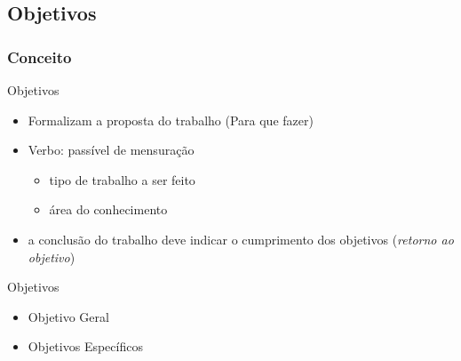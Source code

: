 \documentclass{beamer}
\begin{document}


\subsection{Objetivos}

\subsubsection{Conceito}

\begin{frame}{Objetivos}
  \begin{itemize}
    \footnotesize
  \item Formalizam a proposta do trabalho (\alert{Para que} fazer)
    \bigskip
  \item \alert{Verbo}: passível de mensuração
    \begin{itemize}
      \scriptsize
    \item tipo de trabalho a ser feito
    \item área do conhecimento
    \end{itemize}
    \bigskip
    \item a conclusão do trabalho deve indicar o cumprimento dos
      objetivos ({\em retorno ao objetivo})
  \end{itemize}
\end{frame}

\begin{frame}{Objetivos}
  \begin{itemize}
    \footnotesize
  \item Objetivo Geral
    \bigskip
  \item Objetivos Específicos
  \end{itemize}
\end{frame}
\end{document}
